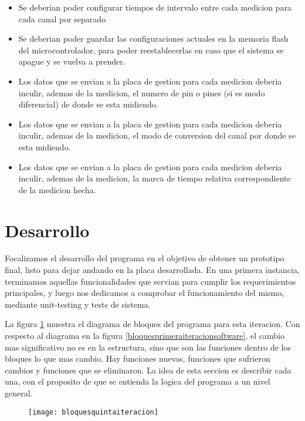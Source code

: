 \begin{itemize}
\item Se deberian poder configurar tiempos de intervalo entre cada medicion para cada canal por separado
\item Se deberian poder guardar las configuraciones actuales en la memoria flash del microcontrolador, para poder reestablecerlas en caso que el sistema se apague y se vuelva a prender.
\item Los datos que se envian a la placa de gestion para cada medicion deberia inculir, ademas de la medicion, el numero de pin o pines (si es modo diferencial) de donde se esta midiendo. 
\item Los datos que se envian a la placa de gestion para cada medicion deberia inculir, ademas de la medicion, el modo de conversion del canal por donde se esta midiendo.
\item Los datos que se envian a la placa de gestion para cada medicion deberia inculir, ademas de la medicion, la marca de tiempo relativa correspondiente de la medicion hecha. 
\end{itemize}



\section{Desarrollo} %
\label{it5:sec:desarrollo}

Focalizamos el desarrollo del programa en el objetivo de obtener un prototipo final, listo para dejar andando en la placa desarrollada. En una primera instancia, terminamos aquellas funcionalidades que servian para cumplir los requerimientos principales, y luego nos dedicamos a comprobar el funcionamiento del mismo, mediante unit-testing y tests de sistema.

La figura \ref{fig:bloquesquintaiteracion} muestra el diagrama de bloques del programa para esta iteracion. Con respecto al diagrama en la figura \ref{bloquesprimeraiteracionsoftware}, el cambio mas significativo no es en la estructura, sino que son las funciones dentro de los bloques lo que mas cambio. Hay funciones nuevas, funciones que sufrieron cambios y funciones que se eliminaron. La idea de esta seccion es describir cada una, con el proposito de que se entienda la logica del programa a un nivel general.

\begin{figure}[h]
  \centering
  \texttt{[image: bloquesquintaiteracion]}
  \caption{}\label{fig:bloquesquintaiteracion}
\end{figure}

